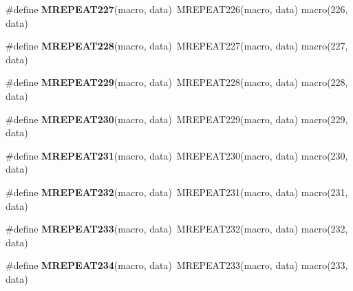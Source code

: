 \begin{DoxyCompactItemize}
\item 
\hypertarget{group__group__xmega__utils__mrepeat_ga395d7e09979a131155a9b2fcfa84b06e}{\#define {\bfseries M\-R\-E\-P\-E\-A\-T227}(macro, data)~M\-R\-E\-P\-E\-A\-T226(macro, data)   macro(226, data)}\label{group__group__xmega__utils__mrepeat_ga395d7e09979a131155a9b2fcfa84b06e}

\item 
\hypertarget{group__group__xmega__utils__mrepeat_ga1976e9b1599c79c7dd75bdeefb924fba}{\#define {\bfseries M\-R\-E\-P\-E\-A\-T228}(macro, data)~M\-R\-E\-P\-E\-A\-T227(macro, data)   macro(227, data)}\label{group__group__xmega__utils__mrepeat_ga1976e9b1599c79c7dd75bdeefb924fba}

\item 
\hypertarget{group__group__xmega__utils__mrepeat_ga0f5e93e8a648f55e0d193221c016771a}{\#define {\bfseries M\-R\-E\-P\-E\-A\-T229}(macro, data)~M\-R\-E\-P\-E\-A\-T228(macro, data)   macro(228, data)}\label{group__group__xmega__utils__mrepeat_ga0f5e93e8a648f55e0d193221c016771a}

\item 
\hypertarget{group__group__xmega__utils__mrepeat_ga4e98b44455fc8c2a542de807ef8f2535}{\#define {\bfseries M\-R\-E\-P\-E\-A\-T230}(macro, data)~M\-R\-E\-P\-E\-A\-T229(macro, data)   macro(229, data)}\label{group__group__xmega__utils__mrepeat_ga4e98b44455fc8c2a542de807ef8f2535}

\item 
\hypertarget{group__group__xmega__utils__mrepeat_ga3f6882a8daac99c9571e37fd306c5451}{\#define {\bfseries M\-R\-E\-P\-E\-A\-T231}(macro, data)~M\-R\-E\-P\-E\-A\-T230(macro, data)   macro(230, data)}\label{group__group__xmega__utils__mrepeat_ga3f6882a8daac99c9571e37fd306c5451}

\item 
\hypertarget{group__group__xmega__utils__mrepeat_ga7adad754d082734bb39548d811081bc3}{\#define {\bfseries M\-R\-E\-P\-E\-A\-T232}(macro, data)~M\-R\-E\-P\-E\-A\-T231(macro, data)   macro(231, data)}\label{group__group__xmega__utils__mrepeat_ga7adad754d082734bb39548d811081bc3}

\item 
\hypertarget{group__group__xmega__utils__mrepeat_ga859709294d903b0f32c05695158fe8a6}{\#define {\bfseries M\-R\-E\-P\-E\-A\-T233}(macro, data)~M\-R\-E\-P\-E\-A\-T232(macro, data)   macro(232, data)}\label{group__group__xmega__utils__mrepeat_ga859709294d903b0f32c05695158fe8a6}

\item 
\hypertarget{group__group__xmega__utils__mrepeat_gadff2111488b4bd5fc5d6407ec9dccefd}{\#define {\bfseries M\-R\-E\-P\-E\-A\-T234}(macro, data)~M\-R\-E\-P\-E\-A\-T233(macro, data)   macro(233, data)}\label{group__group__xmega__utils__mrepeat_gadff2111488b4bd5fc5d6407ec9dccefd}


\end{DoxyCompactItemize}
